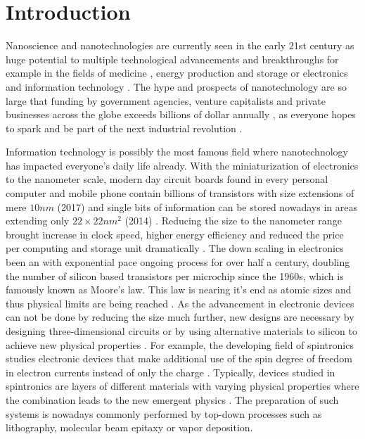 \documentclass[\main/dresen_thesis.tex]{subfiles}
\begin{document}
\chapter{Introduction}\label{ch:introduction}
  Nanoscience and nanotechnologies are currently seen in the early 21st century as huge potential to multiple technological advancements and breakthroughs for example in the fields of medicine \cite{Popat_2011_Nanot, Thanh_2012_Magne}, energy production and storage \cite{Huebler_2009_Digit, Shinn_2012_Nucle} or electronics and information technology \cite{Waser_2012_Nanoe, Duart_2006_Nanot}.
  The hype and prospects of nanotechnology are so large that funding by government agencies, venture capitalists and private businesses across the globe exceeds billions of dollar annually \cite{McCray_2005_Wills}, as everyone hopes to spark and be part of the next industrial revolution \cite{Guston_2010_Encyc}.

  Information technology is possibly the most famous field where nanotechnology has impacted everyone's daily life already.
  With the miniaturization of electronics to the nanometer scale, modern day circuit boards found in every personal computer and mobile phone contain billions of transistors with size extensions of mere $10 \unit{nm}$ (2017) \cite{Courtland_2017_Moores} and single bits of information can be stored nowadays in areas extending only $22 \times 22 \unit{nm^2}$ (2014) \cite{Fontana_2015_Volum}.
  Reducing the size to the nanometer range brought increase in clock speed, higher energy efficiency and reduced the price per computing  and storage unit dramatically \cite{Courtland_2017_Moores}.
  The down scaling in electronics been an with exponential pace ongoing process for over half a century, doubling the number of silicon based transistors per microchip since the 1960s, which is famously known as Moore's law.
  This law is nearing it's end as atomic sizes and thus physical limits are being reached \cite{Waldrop_2016_Moret}.
  As the advancement in electronic devices can not be done by reducing the size much further, new designs are necessary \ie by designing three-dimensional circuits or by using alternative materials to silicon to achieve new physical properties \cite{Waldrop_2016_Moret}.
  For example, the developing field of spintronics studies electronic devices that make additional use of the spin degree of freedom in electron currents instead of only the charge \cite{Wolf_2001_Spint}.
  Typically, devices studied in spintronics are layers of different materials with varying physical properties where the combination leads to the new emergent physics \cite{Zutic_2004_Spint}.
  The preparation of such systems is nowadays commonly performed by top-down processes such as lithography, molecular beam epitaxy or vapor deposition.
\end{document}
